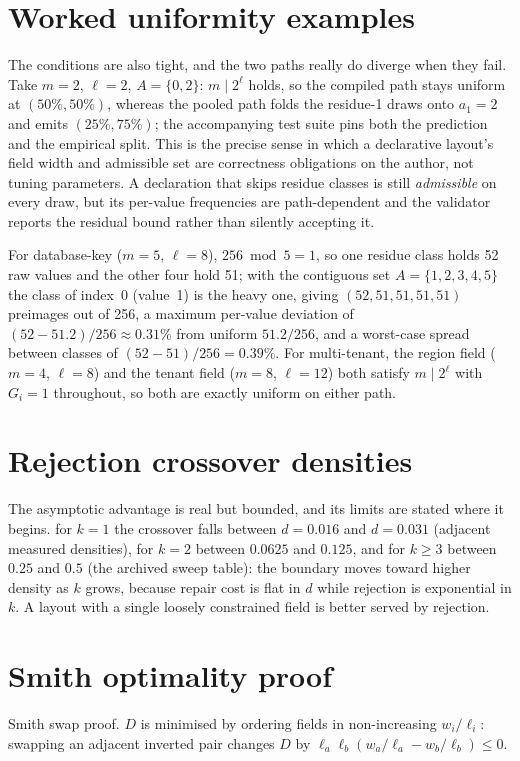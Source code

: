 \documentclass[11pt]{article}
\begin{document}
\section{Worked uniformity examples}
The conditions are also tight, and the two paths really do diverge when they fail. Take $m=2$, $\ell=2$, $A = \{0,2\}$: $m \mid 2^\ell$ holds, so the compiled path stays uniform at $(50\%, 50\%)$, whereas the pooled path folds the residue-1 draws onto $a_1 = 2$ and emits $(25\%, 75\%)$; the accompanying test suite pins both the prediction and the empirical split. This is the precise sense in which a declarative layout's field width and admissible set are correctness obligations on the author, not tuning parameters. A declaration that skips residue classes is still \emph{admissible} on every draw, but its per-value frequencies are path-dependent and the validator reports the residual bound rather than silently accepting it.

For database-key ($m=5$, $\ell=8$), $256 \bmod 5 = 1$, so one residue class holds 52 raw values and the other four hold 51; with the contiguous set $A = \{1,2,3,4,5\}$ the class of index~0 (value~1) is the heavy one, giving $(52,51,51,51,51)$ preimages out of 256, a maximum per-value deviation of $(52 - 51.2)/256 \approx 0.31\%$ from uniform $51.2/256$, and a worst-case spread between classes of $(52-51)/256 = 0.39\%$. For multi-tenant, the region field ($m=4$, $\ell=8$) and the tenant field ($m=8$, $\ell=12$) both satisfy $m \mid 2^\ell$ with $G_i = 1$ throughout, so both are exactly uniform on either path.

\section{Rejection crossover densities}
The asymptotic advantage is real but bounded, and its limits are stated where it begins. for $k=1$ the crossover falls between $d=0.016$ and $d=0.031$ (adjacent
measured densities), for $k=2$ between $0.0625$ and $0.125$, and for
$k \geq 3$ between $0.25$ and $0.5$ (the archived sweep table):
the boundary moves toward higher density as $k$ grows, because repair cost
is flat in $d$ while rejection is exponential in $k$. A layout with a single loosely constrained field is
better served by rejection.

\section{Smith optimality proof}
Smith swap proof. $D$ is minimised by ordering fields in non-increasing $w_i/\ell_i$: swapping an adjacent inverted pair changes $D$ by $\ell_a \ell_b (w_a/\ell_a - w_b/\ell_b) \le 0$.
\end{document}
